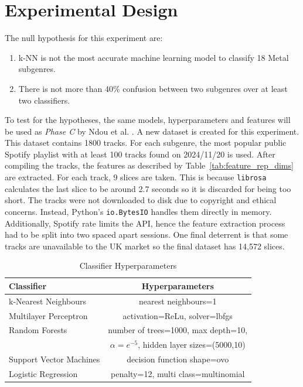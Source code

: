 \section{Experimental Design}
The null hypothesis for this experiment are:
\begin{enumerate}
  \item k-NN is not the most accurate machine learning model to classify 18 Metal subgenres.
  \item There is not more than 40\% confusion between two subgenres over at least two classifiers.
\end{enumerate}


To test for the hypotheses, the same models, hyperparameters and features will be used as \textit{Phase C} by Ndou et al. \cite{ndou2021music}. A new dataset is created for this experiment. This dataset contains 1800 tracks. For each subgenre, the most popular public Spotify playlist with at least 100 tracks found on 2024/11/20 is used. After compiling the tracks, the features as described by Table~\ref{tab:feature_rep_dims} are extracted. For each track, 9 slices are taken. This is because \verb|librosa| calculates the last slice to be around 2.7 seconds so it is discarded for being too short. The tracks were not downloaded to disk due to copyright and ethical concerns. Instead, Python's \verb|io.BytesIO| handles them directly in memory. Additionally, Spotify rate limits the API, hence the feature extraction process had to be split into two spaced apart sessions. One final deterrent is that some tracks are unavailable to the UK market \cite{eriksson2019spotify} so the final dataset has 14,572 slices.

\begin{table}[h!]
\centering
\begin{tabular}{|l|c|}
\hline
\textbf{Classifier} & \textbf{Hyperparameters} \\ \hline
k-Nearest Neighbours & nearest neighbours=1 \\ \hline
Multilayer Perceptron & activation=ReLu, solver=lbfgs \\ \hline
Random Forests & number of trees=1000, max depth=10, \\ 
& $\alpha = e^{-5}$, hidden layer sizes=(5000,10) \\ \hline
Support Vector Machines & decision function shape=ovo \\ \hline
Logistic Regression & penalty=12, multi class=multinomial \\ \hline
\end{tabular}
\caption{Classifier Hyperparameters}
\label{tab:classifier_hyperparams}
\end{table}

